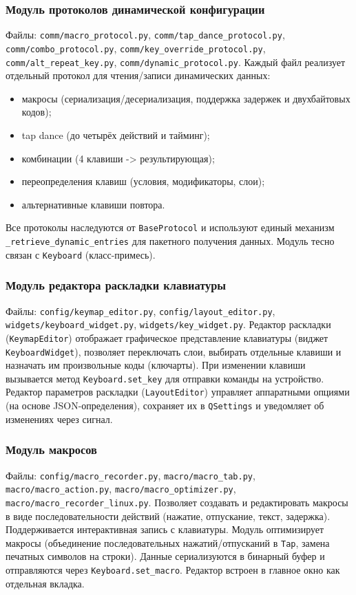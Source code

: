 \subsubsection{Модуль протоколов динамической конфигурации}
Файлы: \texttt{comm/macro\_protocol.py}, \texttt{comm/tap\_dance\_protocol.py}, \texttt{comm/combo\_protocol.py}, \texttt{comm/key\_override\_protocol.py}, \texttt{comm/alt\_repeat\_key.py}, \texttt{comm/dynamic\_protocol.py}.
Каждый файл реализует отдельный протокол для чтения/записи динамических данных:
\begin{itemize}
	\item макросы (сериализация/десериализация, поддержка задержек и двухбайтовых кодов);
	\item tap dance (до четырёх действий и тайминг);
	\item комбинации (4 клавиши -> результирующая);
	\item переопределения клавиш (условия, модификаторы, слои);
	\item альтернативные клавиши повтора.
\end{itemize}
Все протоколы наследуются от \texttt{BaseProtocol} и используют единый механизм \texttt{\_retrieve\_dynamic\_entries} для пакетного получения данных. Модуль тесно связан с \texttt{Keyboard} (класс-примесь).

\subsubsection{Модуль редактора раскладки клавиатуры}
Файлы: \texttt{config/keymap\_editor.py}, \texttt{config/layout\_editor.py}, \texttt{widgets/keyboard\_widget.py}, \texttt{widgets/key\_widget.py}.
Редактор раскладки (\texttt{KeymapEditor}) отображает графическое представление клавиатуры (виджет \texttt{KeyboardWidget}), позволяет переключать слои, выбирать отдельные клавиши и назначать им произвольные коды (ключарты). При изменении клавиши вызывается метод \texttt{Keyboard.set\_key} для отправки команды на устройство. Редактор параметров раскладки (\texttt{LayoutEditor}) управляет аппаратными опциями (на основе JSON-определения), сохраняет их в \texttt{QSettings} и уведомляет об изменениях через сигнал.

\subsubsection{Модуль макросов}
Файлы: \texttt{config/macro\_recorder.py}, \texttt{macro/macro\_tab.py}, \texttt{macro/macro\_action.py}, \texttt{macro/macro\_optimizer.py}, \texttt{macro/macro\_recorder\_linux.py}.
Позволяет создавать и редактировать макросы в виде последовательности действий (нажатие, отпускание, текст, задержка). Поддерживается интерактивная запись с клавиатуры. Модуль оптимизирует макросы (объединение последовательных нажатий/отпусканий в \texttt{Tap}, замена печатных символов на строки). Данные сериализуются в бинарный буфер и отправляются через \texttt{Keyboard.set\_macro}. Редактор встроен в главное окно как отдельная вкладка.

